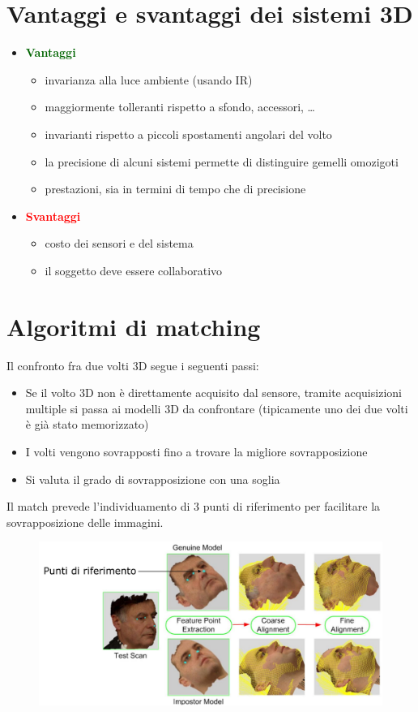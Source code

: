 \documentclass{report}
\begin{document}
\section{Vantaggi e svantaggi dei sistemi 3D}
\begin{itemize}
    \item \textcolor{darkgreen}{\textbf{Vantaggi}}
    \begin{itemize}
        \item invarianza alla luce ambiente (usando IR)
        \item maggiormente tolleranti rispetto a sfondo, accessori, \dots
        \item invarianti rispetto a piccoli spostamenti angolari del volto 
        \item la precisione di alcuni sistemi permette di distinguire gemelli omozigoti 
        \item prestazioni, sia in termini di tempo che di precisione
    \end{itemize}
    \item \textcolor{red}{\textbf{Svantaggi}}
    \begin{itemize}
        \item costo dei sensori e del sistema 
        \item il soggetto deve essere collaborativo
    \end{itemize}
\end{itemize}

\section{Algoritmi di matching}
Il confronto fra due volti 3D segue i seguenti passi:
\begin{itemize}
    \item Se il volto 3D non è direttamente acquisito dal sensore, tramite acquisizioni 
    multiple si passa ai modelli 3D da confrontare (tipicamente uno dei due volti è già stato memorizzato)
    \item I volti vengono sovrapposti fino a trovare la migliore sovrapposizione 
    \item Si valuta il grado di sovrapposizione con una soglia 
\end{itemize}

\noindent Il match prevede l'individuamento di 3 punti di riferimento per 
facilitare la sovrapposizione delle immagini.

\begin{figure}[ht]
    \centering
    \includegraphics[width=1\linewidth]{images/matching3D.png}
\end{figure}
\end{document}
